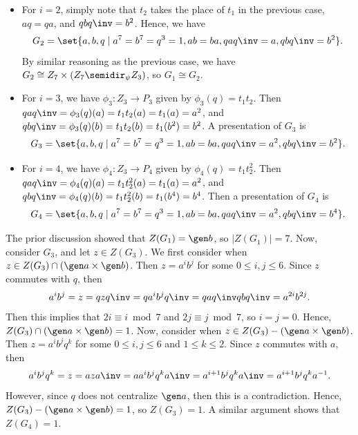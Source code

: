 \begin{solalph}
\begin{itemize}
        If we consider a homomorphism $\psi : Z_3 \to \aut(Z_7)$, then $q \mapsto \alpha$ or $q \mapsto \alpha^2$ such that $\alpha$ generates the unique subgroup of order 3 in $\aut(Z_7)$. In either case, we have $\gen{a, q} \cong Z_7 \semidir_\psi Z_3$ as it satisfies the relations $qaq\inv = a^2$ in the na\"ive presentation. Hence, we have
        \[G_1 \cong Z_7 \times (Z_7 \semidir_\psi Z_3).\]
        \item For $i = 2$, simply note that $t_2$ takes the place of $t_1$ in the previous case, $aq = qa$, and $qbq\inv = b^2$. Hence, we have
        \[G_2 = \set{a, b, q \mid a^7 = b^7 = q^3 = 1, ab = ba, qaq\inv = a, qbq\inv = b^2}.\]
        By similar reasoning as the previous case, we have $G_2 \cong Z_7 \times (Z_7 \semidir_\psi Z_3)$, so $G_1 \cong G_2$.
        \item For $i = 3$, we have $\phi_3 : Z_3 \to P_3$ given by $\phi_3(q) = t_1t_2$. Then $qaq\inv = \phi_3(q)(a) = t_1t_2(a) = t_1(a) = a^2$, and $qbq\inv = \phi_3(q)(b) = t_1t_2(b) = t_1(b^2) = b^2$. A presentation of $G_3$ is
        \[G_3 = \set{a, b, q \mid a^7 = b^7 = q^3 = 1, ab = ba, qaq\inv = a^2, qbq\inv = b^2}.\]
        \item For $i = 4$, we have $\phi_4 : Z_3 \to P_4$ given by $\phi_4(q) = t_1t_2^2$. Then $qaq\inv = \phi_4(q)(a) = t_1t_2^2(a) = t_1(a) = a^2$, and $qbq\inv = \phi_4(q)(b) = t_1t_2^2(b) = t_1(b^4) = b^4$. Then a presentation of $G_4$ is
        \[G_4 = \set{a, b, q \mid a^7 = b^7 = q^3 = 1, ab = ba, qaq\inv = a^2, qbq\inv = b^4}.\]
    \end{itemize}
    \item The prior discussion showed that $Z(G_1) = \gen b$, so $|Z(G_1)| = 7$. Now, consider $G_3$, and let $z \in Z(G_3)$. We first consider when $z \in Z(G_3) \cap (\gen a \times \gen b)$. Then $z = a^ib^j$ for some $0 \leq i, j \leq 6$. Since $z$ commutes with $q$, then 
    \[a^ib^j = z = qzq\inv = qa^ib^jq\inv = qaq\inv qbq\inv = a^{2i}b^{2j}.\]
    Then this implies that $2i \equiv i \bmod 7$ and $2j \equiv j \bmod 7$, so $i = j =0$. Hence, $Z(G_3) \cap (\gen a \times \gen b) = 1$. Now, consider when $z \in Z(G_3) - (\gen a \times \gen b)$. Then $z = a^ib^jq^k$ for some $0 \leq i, j \leq 6$ and $1 \leq k \leq 2$. Since $z$ commutes with $a$, then 
    \[a^ib^jq^k = z = aza\inv = aa^ib^jq^ka\inv = a^{i+1}b^jq^ka\inv = a^{i+1}b^jq^ka^{-1}.\]
    However, since $q$ does not centralize $\gen a$, then this is a contradiction. Hence, $Z(G_3) - (\gen a \times \gen b) = 1$, so $Z(G_3) = 1$. A similar argument shows that $Z(G_4) = 1$.

\end{solalph}
